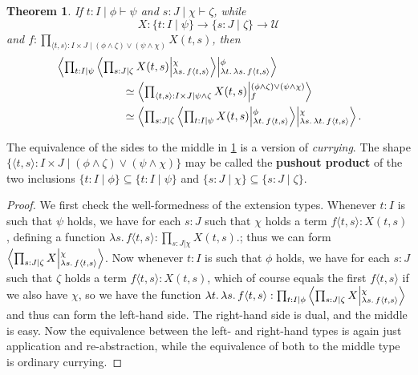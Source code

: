 \documentclass{amsart}
\theoremstyle{plain}
\newtheorem{thm}{Theorem}[section]
\theoremstyle{definition}
\theoremstyle{remark}
\numberwithin{equation}{section}
\newcommand{\tprod}{\textstyle\prod}
\newcommand{\exten}[4]{\left\langle\mathchoice{\textstyle\prod_{#1}}{\textstyle\prod_{#1}}{\scriptstyle\prod_{#1}}{\scriptscriptstyle\prod_{#1}} #2 \middle|^{#3}_{#4}\right\rangle}
\newcommand{\types}{\vdash}
\newcommand{\univtype}{\mathcal{U}}
\newcommand{\sh}[2]{\{#1\mid #2\}}
\newcommand{\pair}[1]{\langle #1\rangle}
\newcommand{\lam}[1]{\lambda #1.\,}
\begin{document}
\begin{thm}\label{thm:exten-curry}
  If $t:I \mid \phi\types\psi$ and $s:J \mid \chi\types\zeta$, while
  \[X:\sh{t:I}{\psi} \to \sh{s:J}{\zeta} \to \univtype\]
  and $f:\tprod_{\pair{t,s}:I\times J\mid (\phi\land\zeta)\lor(\psi\land\chi)} X(t,s)$, then
  \begin{align*} &\exten{t:I|\psi}{\exten{s:J|\zeta}{X(t,s)}{\chi}{\lam{s}f{\pair{t,s}}}}{\phi}{\lam{t}\lam{s}f{\pair{t,s}}}
  \\&\qquad\qquad\qquad\simeq \exten{\pair{t,s}:I\times J|\psi\land\zeta}{X(t,s)}{(\phi\land\zeta)\lor(\psi\land\chi)}{f}
\\&\qquad\qquad\qquad\simeq \exten{s:J|\zeta}{\exten{t:I|\psi}{X(t,s)}{\phi}{\lam{t}f{\pair{t,s}}}}{\chi}{\lam{s}\lam{t}f{\pair{t,s}}}. \end{align*}
\end{thm}
The equivalence of the sides to the middle in \cref{thm:exten-curry} is a version of \emph{currying}.
The shape $\sh{\pair{t,s}:I\times J}{(\phi\land\zeta)\lor(\psi\land\chi)}$ may be called the \textbf{pushout product} of the two inclusions $\sh{t:I}{\phi} \subseteq \sh{t:I}{\psi}$ and $\sh{s:J}{\chi}\subseteq \sh{s:J}{\zeta}$.
\begin{proof}
  We first check the well-formedness of the extension types.
  {Whenever $t : I$ is such that $\psi$ holds, we have for each $s : J$ such that $\chi$ holds a term $f\pair{t,s}:X(t,s)$, defining a function $\lam{s}f\pair{t,s} : \tprod_{s:J|\chi}X(t,s)$.; thus we can form
 $\exten{s:J|\zeta}{X}{\chi}{\lam{s} f\pair{t,s}}$. Now whenever $t : I$ is such that $\phi$ holds, we have for each $s : J$ such that $\zeta$ holds a term $f\pair{t,s}:X(t,s)$, which of course equals the first $f\pair{t,s}$ if we also have $\chi$, so we have the function $\lam{t}\lam{s}f\pair{t,s}:\tprod_{t:I|\phi}\exten{s:J|\zeta}{X}{\chi}{\lam{s} f\pair{t,s}}$ and thus can form the left-hand side.}
  The right-hand side is dual, and the middle is easy.
  Now the equivalence between the left- and right-hand types is again just application and re-abstraction, while the equivalence of both to the middle type is ordinary currying.
\end{proof}
\end{document}
